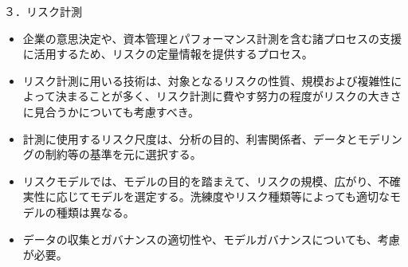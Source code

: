 \documentclass[report,gutter=10mm,fore-edge=10mm,uplatex,dvipdfmx]{jlreq}
\begin{document}
３．リスク計測
\begin{itemize}
\item[] 企業の意思決定や、資本管理とパフォーマンス計測を含む諸プロセスの支援に活用するため、リスクの定量情報を提供するプロセス。
\item[] リスク計測に用いる技術は、対象となるリスクの性質、規模および複雑性によって決まることが多く、リスク計測に費やす努力の程度がリスクの大きさに見合うかについても考慮すべき。
\item[] 計測に使用するリスク尺度は、分析の目的、利害関係者、データとモデリングの制約等の基準を元に選択する。
\item[] リスクモデルでは、モデルの目的を踏まえて、リスクの規模、広がり、不確実性に応じてモデルを選定する。洗練度やリスク種類等によっても適切なモデルの種類は異なる。
\item[] データの収集とガバナンスの適切性や、モデルガバナンスについても、考慮が必要。
\end{itemize}
\end{document}
